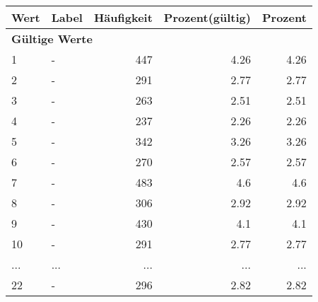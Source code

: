     \begin{longtable}{lXrrr}
     \toprule
     \textbf{Wert} & \textbf{Label} & \textbf{Häufigkeit} & \textbf{Prozent(gültig)} & \textbf{Prozent} \\
     \endhead
     \midrule
     \multicolumn{5}{l}{\textbf{Gültige Werte}}\\
        1 & \multicolumn{1}{X}{-} & %
          \num{447} &
          \num[round-mode=places,round-precision=2]{4.26} &
          \num[round-mode=places,round-precision=2]{4.26} \\
        2 & \multicolumn{1}{X}{-} & %
          \num{291} &
          \num[round-mode=places,round-precision=2]{2.77} &
          \num[round-mode=places,round-precision=2]{2.77} \\
        3 & \multicolumn{1}{X}{-} & %
          \num{263} &
          \num[round-mode=places,round-precision=2]{2.51} &
          \num[round-mode=places,round-precision=2]{2.51} \\
        4 & \multicolumn{1}{X}{-} & %
          \num{237} &
          \num[round-mode=places,round-precision=2]{2.26} &
          \num[round-mode=places,round-precision=2]{2.26} \\
        5 & \multicolumn{1}{X}{-} & %
          \num{342} &
          \num[round-mode=places,round-precision=2]{3.26} &
          \num[round-mode=places,round-precision=2]{3.26} \\
        6 & \multicolumn{1}{X}{-} & %
          \num{270} &
          \num[round-mode=places,round-precision=2]{2.57} &
          \num[round-mode=places,round-precision=2]{2.57} \\
        7 & \multicolumn{1}{X}{-} & %
          \num{483} &
          \num[round-mode=places,round-precision=2]{4.6} &
          \num[round-mode=places,round-precision=2]{4.6} \\
        8 & \multicolumn{1}{X}{-} & %
          \num{306} &
          \num[round-mode=places,round-precision=2]{2.92} &
          \num[round-mode=places,round-precision=2]{2.92} \\
        9 & \multicolumn{1}{X}{-} & %
          \num{430} &
          \num[round-mode=places,round-precision=2]{4.1} &
          \num[round-mode=places,round-precision=2]{4.1} \\
        10 & \multicolumn{1}{X}{-} & %
          \num{291} &
          \num[round-mode=places,round-precision=2]{2.77} &
          \num[round-mode=places,round-precision=2]{2.77} \\
       ... & ... & ... & ... & ... \\
        22 & \multicolumn{1}{X}{-} & %
          \num{296} &
          \num[round-mode=places,round-precision=2]{2.82} &
          \num[round-mode=places,round-precision=2]{2.82} \\


\end{longtable}
